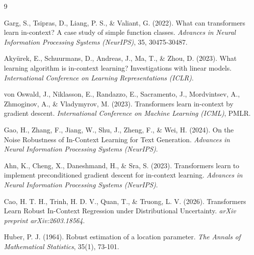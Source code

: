 \documentclass[12pt,a4paper]{article}
\begin{document}
\renewcommand{\refname}{Список литературы}
\begin{thebibliography}{9}

Garg, S., Tsipras, D., Liang, P. S., \& Valiant, G. (2022). What can transformers learn in-context? A case study of simple function classes. \textit{Advances in Neural Information Processing Systems (NeurIPS)}, 35, 30475-30487.

Akyürek, E., Schuurmans, D., Andreas, J., Ma, T., \& Zhou, D. (2023). What learning algorithm is in-context learning? Investigations with linear models. \textit{International Conference on Learning Representations (ICLR)}.

von Oswald, J., Niklasson, E., Randazzo, E., Sacramento, J., Mordvintsev, A., Zhmoginov, A., \& Vladymyrov, M. (2023). Transformers learn in-context by gradient descent. \textit{International Conference on Machine Learning (ICML)}, PMLR.

Gao, H., Zhang, F., Jiang, W., Shu, J., Zheng, F., \& Wei, H. (2024). On the Noise Robustness of In-Context Learning for Text Generation. \textit{Advances in Neural Information Processing Systems (NeurIPS)}.

Ahn, K., Cheng, X., Daneshmand, H., \& Sra, S. (2023). Transformers learn to implement preconditioned gradient descent for in-context learning. \textit{Advances in Neural Information Processing Systems (NeurIPS)}.

Cao, H. T. H., Trinh, H. D. V., Quan, T., \& Truong, L. V. (2026). Transformers Learn Robust In-Context Regression under Distributional Uncertainty. \textit{arXiv preprint arXiv:2603.18564}.

Huber, P. J. (1964). Robust estimation of a location parameter. \textit{The Annals of Mathematical Statistics}, 35(1), 73-101.

\end{thebibliography}
\end{document}
